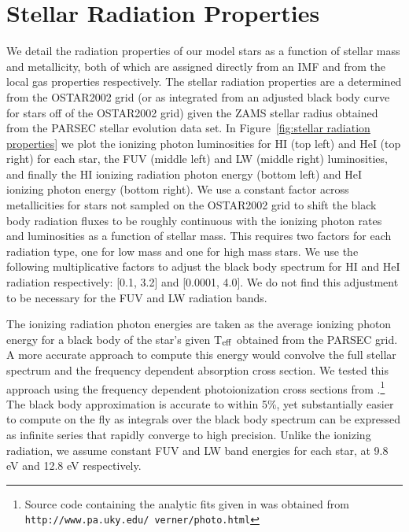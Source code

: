 \documentclass[twocolumn]{aastex61}
\begin{document}
\section{Stellar Radiation Properties}
\label{appendix:radiation}
We detail the radiation properties of our model stars as a function of stellar mass and metallicity, both of which are assigned directly from an IMF and from the local gas properties respectively. The stellar radiation properties are a determined from the OSTAR2002 grid \citep{Lanz2003} (or as integrated from an adjusted black body curve for stars off of the OSTAR2002 grid) given the ZAMS stellar radius obtained from the PARSEC \citep{Bressan2012,Tang2014} stellar evolution data set. In Figure~\ref{fig:stellar radiation properties} we plot the ionizing photon luminosities for HI (top left) and HeI (top right) for each star, the FUV (middle left) and LW (middle right) luminosities, and finally the HI ionizing radiation photon energy (bottom left) and HeI ionizing photon energy (bottom right). We use a constant factor across metallicities for stars not sampled on the OSTAR2002 grid to shift the black body radiation fluxes to be roughly continuous with the ionizing photon rates and luminosities as a function of stellar mass. This requires two factors for each radiation type, one for low mass and one for high mass stars. We use the following multiplicative factors to adjust the black body spectrum for HI and HeI radiation respectively: [0.1, 3.2] and [0.0001, 4.0]. We do not find this adjustment to be necessary for the FUV and LW radiation bands.

The ionizing radiation photon energies are taken as the average ionizing photon energy for a black body of the star's given T$_{\rm eff}$ obtained from the PARSEC grid. A more accurate approach to compute this energy would convolve the full stellar spectrum and the frequency dependent absorption cross section. We tested this approach using the frequency dependent photoionization cross sections from \citet{1996ApJ...465..487V}.\footnote{Source code containing the analytic fits given in \citet{1996ApJ...465..487V} was obtained from \texttt{http://www.pa.uky.edu/~verner/photo.html}} The black body approximation is accurate to within 5\%, yet substantially easier to compute on the fly as integrals over the black body spectrum can be expressed as infinite series that rapidly converge to high precision. Unlike the ionizing radiation, we assume constant FUV and LW band energies for each star, at 9.8 eV and 12.8 eV respectively.
\end{document}
